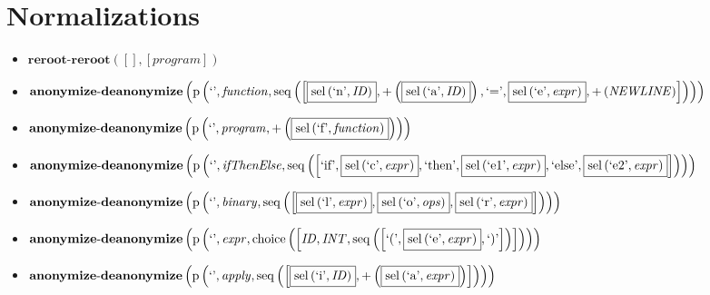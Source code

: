 \section{Normalizations}
{\footnotesize\begin{itemize}
\item $\mathbf{reroot\text{-}reroot}\left([],[\mathit{program}]\right)$
\item $\mathbf{anonymize\text{-}deanonymize}\\\left(\mathrm{p}\left(\text{`'},\mathit{function},\mathrm{seq}\left(\left[\fbox{$\mathrm{sel}\left(\text{`n'},\mathit{ID}\right)$}, {+}\left(\fbox{$\mathrm{sel}\left(\text{`a'},\mathit{ID}\right)$}\right), \text{`='}, \fbox{$\mathrm{sel}\left(\text{`e'},\mathit{expr}\right)$}, {+}\left(\mathit{NEWLINE}\right)\right]\right)\right)\right)$
\item $\mathbf{anonymize\text{-}deanonymize}\\\left(\mathrm{p}\left(\text{`'},\mathit{program},{+}\left(\fbox{$\mathrm{sel}\left(\text{`f'},\mathit{function}\right)$}\right)\right)\right)$
\item $\mathbf{anonymize\text{-}deanonymize}\\\left(\mathrm{p}\left(\text{`'},\mathit{ifThenElse},\mathrm{seq}\left(\left[\text{`if'}, \fbox{$\mathrm{sel}\left(\text{`c'},\mathit{expr}\right)$}, \text{`then'}, \fbox{$\mathrm{sel}\left(\text{`e1'},\mathit{expr}\right)$}, \text{`else'}, \fbox{$\mathrm{sel}\left(\text{`e2'},\mathit{expr}\right)$}\right]\right)\right)\right)$
\item $\mathbf{anonymize\text{-}deanonymize}\\\left(\mathrm{p}\left(\text{`'},\mathit{binary},\mathrm{seq}\left(\left[\fbox{$\mathrm{sel}\left(\text{`l'},\mathit{expr}\right)$}, \fbox{$\mathrm{sel}\left(\text{`o'},\mathit{ops}\right)$}, \fbox{$\mathrm{sel}\left(\text{`r'},\mathit{expr}\right)$}\right]\right)\right)\right)$
\item $\mathbf{anonymize\text{-}deanonymize}\\\left(\mathrm{p}\left(\text{`'},\mathit{expr},\mathrm{choice}\left(\left[\mathit{ID}, \mathit{INT}, \mathrm{seq}\left(\left[\text{`('}, \fbox{$\mathrm{sel}\left(\text{`e'},\mathit{expr}\right)$}, \text{`)'}\right]\right)\right]\right)\right)\right)$
\item $\mathbf{anonymize\text{-}deanonymize}\\\left(\mathrm{p}\left(\text{`'},\mathit{apply},\mathrm{seq}\left(\left[\fbox{$\mathrm{sel}\left(\text{`i'},\mathit{ID}\right)$}, {+}\left(\fbox{$\mathrm{sel}\left(\text{`a'},\mathit{expr}\right)$}\right)\right]\right)\right)\right)$

\end{itemize}}
